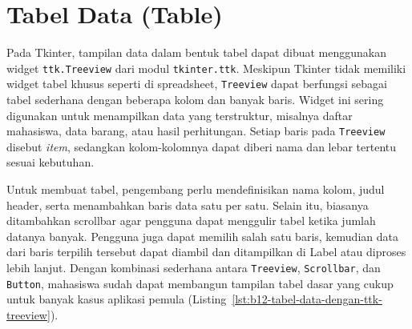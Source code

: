 \section{Tabel Data (Table)}

Pada Tkinter, tampilan data dalam bentuk tabel dapat dibuat menggunakan widget \texttt{ttk.Treeview} dari modul \texttt{tkinter.ttk}. Meskipun Tkinter tidak memiliki widget tabel khusus seperti di spreadsheet, \texttt{Treeview} dapat berfungsi sebagai tabel sederhana dengan beberapa kolom dan banyak baris. Widget ini sering digunakan untuk menampilkan data yang terstruktur, misalnya daftar mahasiswa, data barang, atau hasil perhitungan. Setiap baris pada \texttt{Treeview} disebut \textit{item}, sedangkan kolom-kolomnya dapat diberi nama dan lebar tertentu sesuai kebutuhan.

Untuk membuat tabel, pengembang perlu mendefinisikan nama kolom, judul header, serta menambahkan baris data satu per satu. Selain itu, biasanya ditambahkan scrollbar agar pengguna dapat menggulir tabel ketika jumlah datanya banyak. Pengguna juga dapat memilih salah satu baris, kemudian data dari baris terpilih tersebut dapat diambil dan ditampilkan di Label atau diproses lebih lanjut. Dengan kombinasi sederhana antara \texttt{Treeview}, \texttt{Scrollbar}, dan \texttt{Button}, mahasiswa sudah dapat membangun tampilan tabel dasar yang cukup untuk banyak kasus aplikasi pemula (Listing~\ref{lst:b12-tabel-data-dengan-ttk-treeview}).

